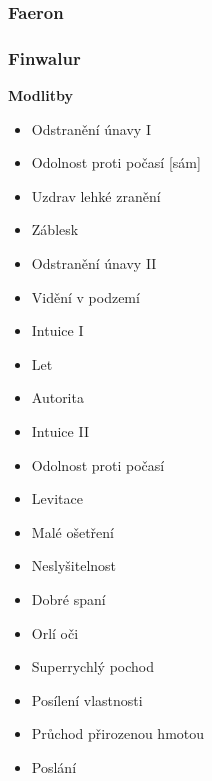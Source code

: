 \documentclass[../main.tex]{subfiles}
\begin{document}
\subsubsection{Faeron}
\label{sec:faeron}

\subsubsection{Finwalur}
\label{sec:finwalur}

\textbf{Modlitby}

\begin{itemize}

\item Odstranění únavy I
\item Odolnost proti počasí [sám]
\item Uzdrav lehké zranění
\item Záblesk
\item Odstranění únavy II
\item Vidění v podzemí
\item Intuice I
\item Let 
\item Autorita
\item Intuice II
\item Odolnost proti počasí
\item Levitace
\item Malé ošetření
\item Neslyšitelnost
\item Dobré spaní
\item Orlí oči
\item Superrychlý pochod
\item Posílení vlastnosti
\item Průchod přirozenou hmotou
\item Poslání

\end{itemize}
\end{document}
